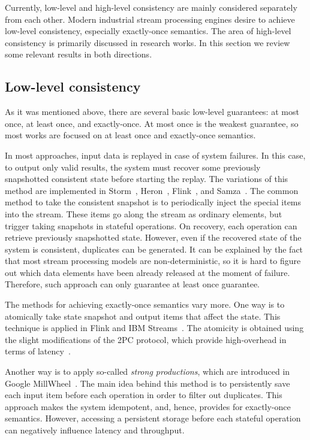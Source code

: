 \label{fs-phd-related}

Currently, low-level and high-level consistency are mainly considered separately from each other. Modern industrial stream processing engines desire to achieve low-level consistency, especially exactly-once semantics. The area of high-level consistency is primarily discussed in research works. In this section we review some relevant results in both directions. 

\subsection{Low-level consistency}
As it was mentioned above, there are several basic low-level guarantees: at most once, at least once, and exactly-once. At most once is the weakest guarantee, so most works are focused on at least once and exactly-once semantics.

In most approaches, input data is replayed in case of system failures. In this case, to output only valid results, the system must recover some previously snapshotted consistent state before starting the replay. The variations of this method are implemented in Storm~\cite{apache:storm}, Heron~\cite{Kulkarni:2015:THS:2723372.2742788}, Flink~\cite{Carbone:2017:SMA:3137765.3137777}, and Samza~\cite{Noghabi:2017:SSS:3137765.3137770}. The common method to take the consistent snapshot is to periodically inject the special items into the stream. These items go along the stream as ordinary elements, but trigger taking snapshots in stateful operations. On recovery, each operation can retrieve previously snapshotted state. However, even if the recovered state of the system is consistent, duplicates can be generated. It can be explained by the fact that most stream processing models are non-deterministic, so it is hard to figure out which data elements have been already released at the moment of failure. Therefore, such approach can only guarantee at least once guarantee. 

The methods for achieving exactly-once semantics vary more. One way is to atomically take state snapshot and output items that affect the state. This technique is applied in Flink and IBM Streams~\cite{jacques2016consistent}. The atomicity is obtained using the slight modifications of the 2PC protocol, which provide high-overhead in terms of latency~\cite{we2018beyondmr}.

Another way is to apply so-called {\em strong productions}, which are introduced in Google MillWheel~\cite{Akidau:2013:MFS:2536222.2536229}. The main idea behind this method is to persistently save each input item before each operation in order to filter out duplicates. This approach makes the system idempotent, and, hence, provides for exactly-once semantics. However, accessing a persistent storage before each stateful operation can negatively influence latency and throughput.

